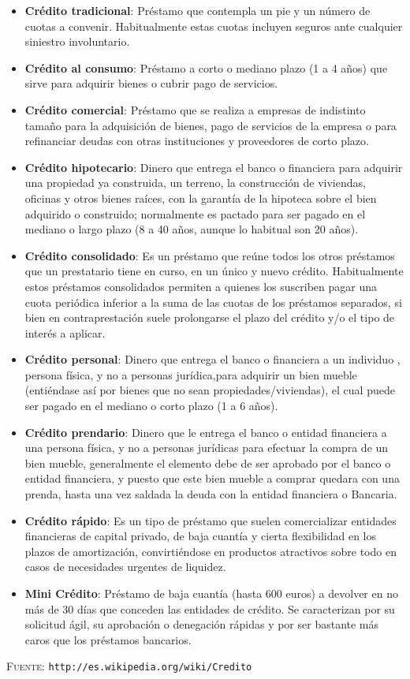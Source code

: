 \documentclass{article}
\begin{document}
\begin{itemize}
\item \textbf{Crédito tradicional}: Préstamo que contempla un pie y un número de cuotas a convenir. Habitualmente estas cuotas incluyen seguros ante cualquier siniestro involuntario.
\item \textbf{Crédito al consumo}: Préstamo a corto o mediano plazo (1 a 4 años) que sirve para adquirir bienes o cubrir pago de servicios.
\item \textbf{Crédito comercial}: Préstamo que se realiza a empresas de indistinto tamaño para la adquisición de bienes, pago de servicios de la empresa o para refinanciar deudas con otras instituciones y proveedores de corto plazo.
\item \textbf{Crédito hipotecario}: Dinero que entrega el banco o financiera para adquirir una propiedad ya construida, un terreno, la construcción de viviendas, oficinas y otros bienes raíces, con la garantía de la hipoteca sobre el bien adquirido o construido; normalmente es pactado para ser pagado en el mediano o largo plazo (8 a 40 años, aunque lo habitual son 20 años).
\item \textbf{Crédito consolidado}: Es un préstamo que reúne todos los otros préstamos que un prestatario tiene en curso, en un único y nuevo crédito. Habitualmente estos préstamos consolidados permiten a quienes los suscriben pagar una cuota periódica inferior a la suma de las cuotas de los préstamos separados, si bien en contraprestación suele prolongarse el plazo del crédito y/o el tipo de interés a aplicar.
\item \textbf{Crédito personal}: Dinero que entrega el banco o financiera a un individuo , persona física, y no a personas jurídica,para adquirir un bien mueble (entiéndase así por bienes que no sean propiedades/viviendas), el cual puede ser pagado en el mediano o corto plazo (1 a 6 años).
\item \textbf{Crédito prendario}: Dinero que le entrega el banco o entidad financiera a una persona física, y no a personas jurídicas para efectuar la compra de un bien mueble, generalmente el elemento debe de ser aprobado por el banco o entidad financiera, y puesto que este bien mueble a comprar quedara con una prenda, hasta una vez saldada la deuda con la entidad financiera o Bancaria.
\item \textbf{Crédito rápido}: Es un tipo de préstamo que suelen comercializar entidades financieras de capital privado, de baja cuantía y cierta flexibilidad en los plazos de amortización, convirtiéndose en productos atractivos sobre todo en casos de necesidades urgentes de liquidez.
\item \textbf{Mini Crédito}: Préstamo de baja cuantía (hasta 600 euros) a devolver en no más de 30 días que conceden las entidades de crédito. Se caracterizan por su solicitud ágil, su aprobación o denegación rápidas y por ser bastante más caros que los préstamos bancarios. 

\end{itemize}

\noindent \textsc{Fuente:} \texttt{http://es.wikipedia.org/wiki/Credito}
\end{document}
